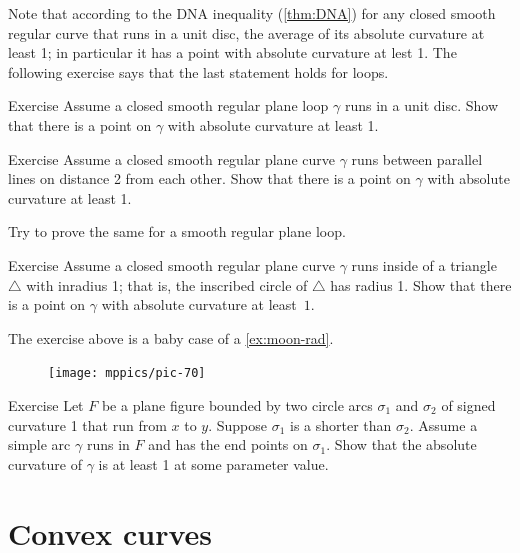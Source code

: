 Note that according to the DNA inequality (\ref{thm:DNA}) for any closed smooth regular curve that runs in a unit disc, the average of its absolute curvature at least 1; in particular it has a point with absolute curvature at lest 1.
The following exercise says that the last statement holds for loops.

\begin{thm}{Exercise}\label{ex:in-circle}
Assume a closed smooth regular plane loop $\gamma$ runs in a unit disc.
Show that there is a point on $\gamma$ with absolute curvature at least 1.
\end{thm}


\begin{thm}{Exercise}\label{ex:between-parallels-1}
Assume a closed smooth regular plane curve $\gamma$ runs between parallel lines on distance 2 from each other.
Show that there is a point on $\gamma$ with absolute curvature at least 1.

Try to prove the same for a smooth regular plane loop.
\end{thm}

\begin{thm}{Exercise}\label{ex:in-triangle}
Assume a closed smooth regular plane curve $\gamma$ runs inside of a triangle $\triangle$ with inradius 1; that is, the inscribed circle of $\triangle$ has radius 1.
Show that there is a point on $\gamma$ with absolute curvature at least~$1$.
\end{thm}

The exercise above is a baby case of a \ref{ex:moon-rad}.

{

\begin{figure}
\vskip-4mm
\centering
\texttt{[image: mppics/pic-70]}
\vskip0mm
\end{figure}

\begin{thm}{Exercise}\label{ex:lens}
Let $F$ be a plane figure bounded by two circle arcs $\sigma_1$ and $\sigma_2$ of signed curvature 1 that run from $x$ to $y$.
Suppose $\sigma_1$ is a shorter than $\sigma_2$.
Assume a simple arc $\gamma$ runs in $F$ and has the end points on $\sigma_1$.
Show that the absolute curvature of $\gamma$ is at least 1 at some parameter value.

\end{thm}

}

\section{Convex curves}

